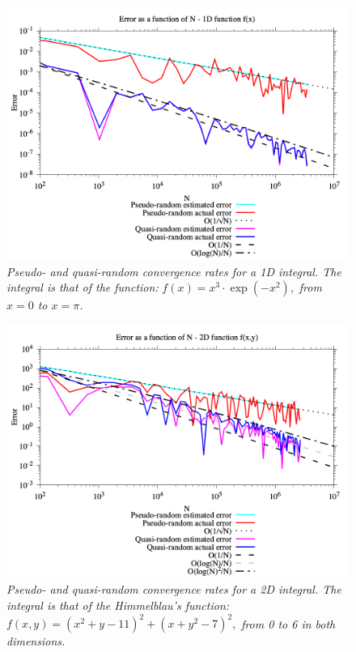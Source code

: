 \documentclass{article}
\begin{document}
\begin{figure}[t]
    \centering
    \includegraphics[width=\textwidth]{Convergence1D.png}
    \caption{\textsl{Pseudo- and quasi-random convergence rates for a 1D integral. The integral is that
of the function:} $f(x)=x^3\cdot\exp(-x^2),$ \textsl{from $x=0$ to $x=\pi$.}}
    \label{fig:1D}
\end{figure}

\begin{figure}[t]
    \centering
    \includegraphics[width=\textwidth]{Convergence2D.png}
    \caption{\textsl{Pseudo- and quasi-random convergence rates for a 2D integral. The integral is that 
of the Himmelblau's function:} $f(x,y)=(x^2+y-11)^2+(x+y^2-7)^2,$ \textsl{from 0 to 6 in both dimensions.}}
    \label{fig:2D}
\end{figure}
\end{document}
